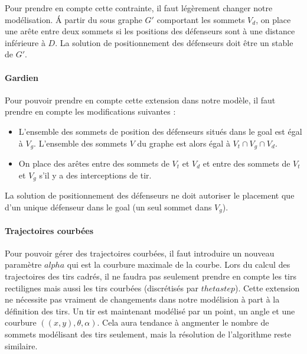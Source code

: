 \documentclass{article}
\begin{document}
Pour prendre en compte cette contrainte, il faut légèrement changer notre modélisation. \'A partir du sous graphe $G'$ comportant les sommets $V_d$, on place une arête entre deux sommets si les positions des défenseurs sont à une distance inférieure à $D$. La solution de positionnement des défenseurs doit être un stable de $G'$.



\paragraph{Gardien}
Pour pouvoir prendre en compte cette extension dans notre modèle, il faut prendre en compte les modifications suivantes :
\begin{itemize}
  \item L'ensemble des sommets de position des défenseurs situés dans le goal est égal à $V_g$. L'ensemble des sommets $V$ du graphe est alors égal à $V_t \cap V_g \cap V_d$.
  \item On place des arêtes entre des sommets de $V_t$ et $V_d$ et entre des sommets de $V_t$ et $V_g$ s'il y a des interceptions de tir.
\end{itemize}

La solution de positionnement des défenseurs ne doit autoriser le placement que d'un unique défenseur dans le goal (un seul sommet dans $V_g$).

\paragraph{Trajectoires courbées}
Pour pouvoir gérer des trajectoires courbées, il faut introduire un nouveau paramètre $alpha$ qui est la courbure maximale de la courbe. Lors du calcul des trajectoires des tirs cadrés, il ne faudra pas seulement prendre en compte les tirs rectilignes mais aussi les tirs courbées (discrétisés par $thetastep$).
Cette extension ne nécessite pas vraiment de changements dans notre modélision à part à la définition des tirs. Un tir est maintenant modélisé par un point, un angle et une courbure $((x,y), \theta, \alpha)$. Cela aura tendance à angmenter le nombre de sommets modélisant des tirs seulement, mais la résolution de l'algorithme reste similaire.
\end{document}
